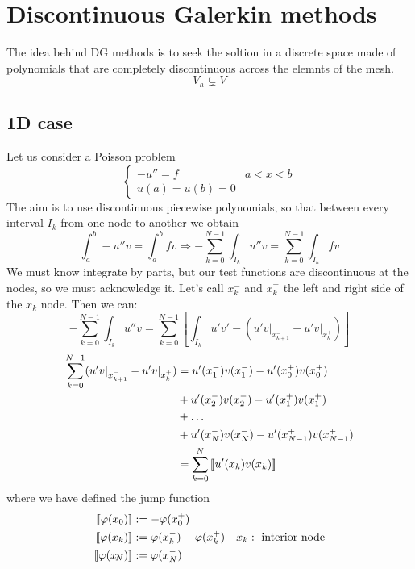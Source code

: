 \section{Discontinuous Galerkin methods}
The idea behind DG methods is to seek the soltion in a discrete space made of polynomials that are completely discontinuous across the elemnts of the mesh.
\[
    V_h \subsetneq V
\]
\subsection{1D case}
Let us consider a Poisson problem 
\[
    \begin{cases}
        -u'' = f & a < x < b \\
        u(a) = u(b) = 0
    \end{cases}
\]
The aim is to use discontinuous piecewise polynomials, so that between every interval \(I_k\) from one node to another we obtain
\[
    \int_{a}^b -u''v = \int_a^b fv \Rightarrow - \sum_{k=0}^{N-1} \int_{I_k} u''v = \sum_{k=0}^{N-1} \int_{I_k} fv
\]
We must know integrate by parts, but our test functions are discontinuous at the nodes, so we must acknowledge it. Let's call \(x_k^-\) and \(x_k^+\) the left and right side of the \(x_k\) node. Then we can:
\begin{equation}
    -\sum_{k=0}^{N-1} \int_{I_k} u''v = \sum_{k=0}^{N-1} \left[ \int_{I_k}u'v' - \left( u'v\vert_{x_{k+1}^-} - u'v\vert_{x_k^+} \right) \right] \label{integration_by_parts_dg}
\end{equation}
    \begin{align}
    \sum_{k=0}^{N-1} (u'v\vert_{x_{k+1}^-} - u'v\vert_{x_k^+}) &= u'(x_1^-)v(x_1^-) - u'(x_0^+)v(x_0^+) \nonumber\\
    & + u'(x_2^-)v(x_2^-) - u'(x_1^+)v(x_1^+) \nonumber\\
    & + \ldots \\
    & + u'(x_N^-)v(x_N^-) - u'(x_{N-1}^+)v(x_{N-1}^+) \nonumber\\
    & = \sum_{k=0}^{N} \left[\!\left[u'(x_k)v(x_k)\right]\!\right] \nonumber \label{step_for_jump_dg}
\end{align}
where we have defined the jump function
\begin{align}
    \left[\!\left[\varphi(x_0)\right]\!\right] &:= -\varphi(x^+_0) & \nonumber\\
    \left[\!\left[\varphi(x_k)\right]\!\right] &:= \varphi(x_k^-) -\varphi(x^+_k) & x_k :\text{ interior node} \\
    \left[\!\left[\varphi(x_{\!N})\right]\!\right] &:= \varphi(x^-_N) &\nonumber \label{jump_function}
\end{align}
